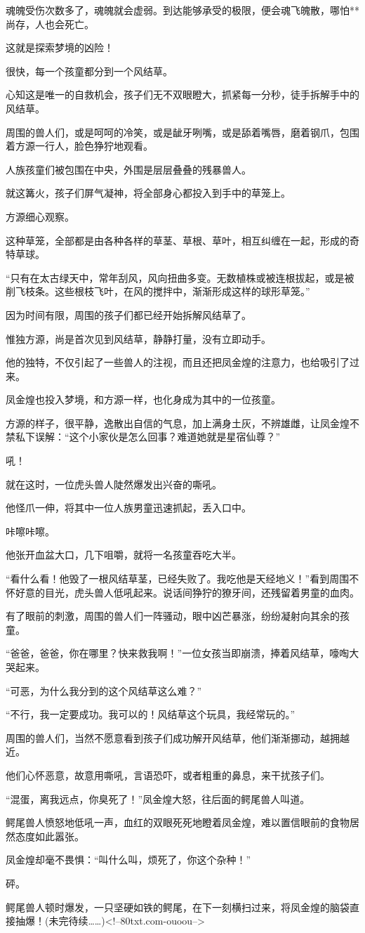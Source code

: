 \begin{this_body}
魂魄受伤次数多了，魂魄就会虚弱。到达能够承受的极限，便会魂飞魄散，哪怕**尚存，人也会死亡。

这就是探索梦境的凶险！

很快，每一个孩童都分到一个风结草。

心知这是唯一的自救机会，孩子们无不双眼瞪大，抓紧每一分秒，徒手拆解手中的风结草。

周围的兽人们，或是呵呵的冷笑，或是龇牙咧嘴，或是舔着嘴唇，磨着钢爪，包围着方源一行人，脸色狰狞地观看。

人族孩童们被包围在中央，外围是层层叠叠的残暴兽人。

就这篝火，孩子们屏气凝神，将全部身心都投入到手中的草笼上。

方源细心观察。

这种草笼，全部都是由各种各样的草茎、草根、草叶，相互纠缠在一起，形成的奇特草球。

“只有在太古绿天中，常年刮风，风向扭曲多变。无数植株或被连根拔起，或是被削飞枝条。这些根枝飞叶，在风的搅拌中，渐渐形成这样的球形草笼。”

因为时间有限，周围的孩子们都已经开始拆解风结草了。

惟独方源，尚是首次见到风结草，静静打量，没有立即动手。

他的独特，不仅引起了一些兽人的注视，而且还把凤金煌的注意力，也给吸引了过来。

凤金煌也投入梦境，和方源一样，也化身成为其中的一位孩童。

方源的样子，很平静，逸散出自信的气息，加上满身土灰，不辨雄雌，让凤金煌不禁私下误解：“这个小家伙是怎么回事？难道她就是星宿仙尊？”

吼！

就在这时，一位虎头兽人陡然爆发出兴奋的嘶吼。

他怪爪一伸，将其中一位人族男童迅速抓起，丢入口中。

咔嚓咔嚓。

他张开血盆大口，几下咀嚼，就将一名孩童吞吃大半。

“看什么看！他毁了一根风结草茎，已经失败了。我吃他是天经地义！”看到周围不怀好意的目光，虎头兽人低吼起来。说话间狰狞的獠牙间，还残留着男童的血肉。

有了眼前的刺激，周围的兽人们一阵骚动，眼中凶芒暴涨，纷纷凝射向其余的孩童。

“爸爸，爸爸，你在哪里？快来救我啊！”一位女孩当即崩溃，捧着风结草，嚎啕大哭起来。

“可恶，为什么我分到的这个风结草这么难？”

“不行，我一定要成功。我可以的！风结草这个玩具，我经常玩的。”

周围的兽人们，当然不愿意看到孩子们成功解开风结草，他们渐渐挪动，越拥越近。

他们心怀恶意，故意用嘶吼，言语恐吓，或者粗重的鼻息，来干扰孩子们。

“混蛋，离我远点，你臭死了！”凤金煌大怒，往后面的鳄尾兽人叫道。

鳄尾兽人愤怒地低吼一声，血红的双眼死死地瞪着凤金煌，难以置信眼前的食物居然态度如此嚣张。

凤金煌却毫不畏惧：“叫什么叫，烦死了，你这个杂种！”

砰。

鳄尾兽人顿时爆发，一只坚硬如铁的鳄尾，在下一刻横扫过来，将凤金煌的脑袋直接抽爆！(未完待续……)<!--80txt.com-ouoou-->

\end{this_body}

